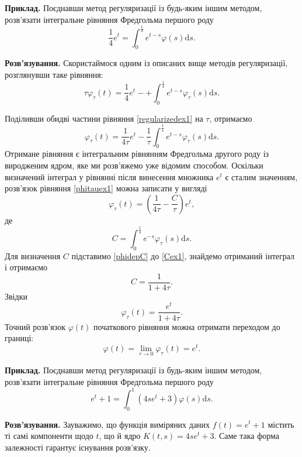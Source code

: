 \documentclass[14pt,twoside]{extreport}
\theoremstyle{mystyle}
\numberwithin{equation}{chapter}
\begin{document}
\begin{small}
\textbf{Приклад.} Поєднавши метод регуляризації із будь-яким іншим методом, розв'язати інтегральне рівняння Фредгольма першого роду
\[
\displaystyle \frac{1}{4}e^{t}=\int_{0}^{\frac{1}{4}}e^{t-s} \varphi(s)\mathrm{d}s.
\]

\textbf{Розв'язування.}
Скористаймося одним із описаних вище методів регуляризації, розглянувши таке рівняння:
\begin{equation}\label{regularizedex1}
 \tau \varphi_{\tau}(t) = \frac{1}{4}e^{t} - + \int_{0}^{\frac{1}{4}}e^{t-s} \varphi_{\tau}(s)\mathrm{d}s.
\end{equation}

Поділивши обидві частини рівняння \eqref{regularizedex1} на $\tau$, отримаємо
\begin{equation}\label{phitauex1}
\varphi_{\tau}(t)=\displaystyle \frac{1}{4\tau}e^{t}-\frac{1}{\tau}\int_{0}^{\frac{1}{4}}e^{t-s}\varphi_{\tau}(s)\mathrm{d}s.
\end{equation}
Отримане рівняння є інтегральним рівнянням Фредгольма другого роду із виродженим ядром, яке ми розв'яжемо уже відомим способом. Оскільки визначений інтеграл у рівнянні після винесення множника $e^t$ є сталим значенням, розв'язок рівняння \eqref{phitauex1} можна записати у вигляді
\begin{equation}\label{phidepC}
\varphi_{\tau}(t)=\left(\displaystyle \frac{1}{4\tau}-\frac{C}{\tau}\right)e^{t},
\end{equation}
де
\begin{equation}\label{Cex1}
\displaystyle C=\int_{0}^{\frac{1}{4}}e^{-s}\varphi_{\tau}(s)\mathrm{d}s.
\end{equation}
Для визначення $C$ підставимо \eqref{phidepC} до \eqref{Cex1}, знайдемо отриманий інтеграл і отримаємо
\[
C=\displaystyle \frac{1}{1+4\tau}.
\]
Звідки
\[
\varphi_{\tau}(t)=\displaystyle \frac{e^{t}}{1+4\tau}.
\]
Точний розв'язок $\varphi(t)$ початкового рівняння можна отримати переходом до границі:
\[
\varphi(t)=\displaystyle \lim\limits_{\tau\to 0}\varphi_{\tau}(t)=e^{t}.
\]

\textbf{Приклад.} Поєднавши метод регуляризації із будь-яким іншим методом, розв'язати інтегральне рівняння Фредгольма першого роду
\[
e^{t}+1=\displaystyle \int_{0}^{1}(4se^{t}+3)\varphi(s)\mathrm{d}s.
\]

\textbf{Розв'язування.}
Зауважимо, що функція виміряних даних $f(t)=e^{t}+1$ містить ті самі компоненти щодо $t$, що й ядро $K(t, s)=4se^{t}+3$. Саме така форма залежності гарантує існування розв'язку.


\end{small}
\end{document}
